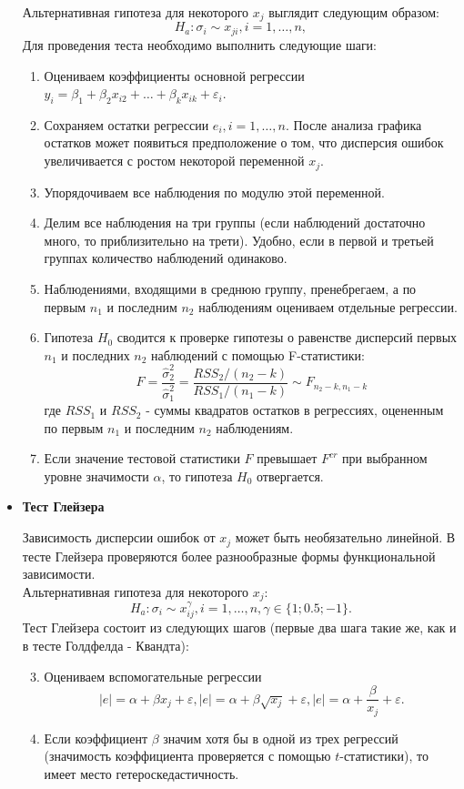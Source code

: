 \documentclass[a0,final]{a0poster}
\begin{document}
\begin{multicols}{4}
\begin{itemize}
Альтернативная гипотеза для некоторого $x_j$ выглядит следующим образом:
\[H_a: \sigma_i \sim x_{ji},  i = 1, \ldots, n,\]
Для проведения теста необходимо выполнить следующие шаги:\\

\begin{enumerate}
\item Оцениваем коэффициенты основной регрессии $y_i = \beta_1 + \beta_2x_{i2} + \ldots + \beta_kx_{ik} + \varepsilon_i$.
\item Сохраняем остатки регрессии $e_i,  i = 1, \ldots, n$. После анализа графика остатков может появиться предположение о том, что дисперсия ошибок увеличивается с ростом некоторой переменной $x_j$.
\item Упорядочиваем все наблюдения по модулю этой переменной.
\item Делим все наблюдения на три группы (если наблюдений достаточно много, то приблизительно на трети). Удобно, если в первой и третьей группах количество наблюдений одинаково.
\item Наблюдениями, входящими в среднюю группу, пренебрегаем, а по первым $n_1$ и последним $n_2$ наблюдениям оцениваем отдельные регрессии.
\item Гипотеза $H_0$ сводится к проверке гипотезы о равенстве дисперсий первых $n_1$ и последних $n_2$ наблюдений с помощью F-статистики: \[F = \frac{\hat{\sigma}^2_{2}}{\hat{\sigma}^2_{1}} = \frac{RSS_2/{(n_2 - k)}}{RSS_1/{(n_1 - k)}} \sim F_{n_2-k, n_1-k}\]где $RSS_1$ и $RSS_2$ - суммы квадратов остатков в регрессиях, оцененным по первым $n_1$ и последним $n_2$ наблюдениям.
\item Если значение тестовой статистики $F$ превышает $F^{cr}$ при выбранном уровне значимости $\alpha$, то гипотеза $H_0$ отвергается.
\end{enumerate}

\item \textbf{Тест Глейзера}

Зависимость дисперсии ошибок от $x_j$ может быть необязательно линейной. В тесте Глейзера проверяются более разнообразные формы функциональной зависимости. \\

Альтернативная гипотеза для некоторого $x_j$: \[H_a: \sigma_i \sim x_{ij}^\gamma,  i = 1, \ldots, n, \gamma \in \{1; 0.5; -1\}.\]
Тест Глейзера состоит из следующих шагов (первые два шага такие же, как и в тесте Голдфелда - Квандта):
\begin{enumerate}
\setcounter{enumi}{2}
\item Оцениваем вспомогательные регрессии \[|e| = \alpha + \beta x_j + \varepsilon, |e| = \alpha + \beta \sqrt{x_j} + \varepsilon, |e| = \alpha + \frac{\beta} {x_j} + \varepsilon.\]
\item Если коэффициент $\beta$ значим хотя бы в одной из трех регрессий (значимость коэффициента проверяется с помощью $t$-статистики), то имеет место гетероскедастичность.\\
\end{enumerate}


\end{itemize}
\end{multicols}
\end{document}
